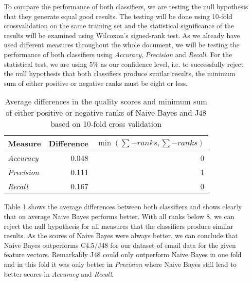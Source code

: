 To compare the performance of both classifiers, we are testing the null hypothesis that they generate equal good results.
The testing will be done using 10-fold crossvalidation on the same training set and the statistical significance of the results will be examined using Wilcoxon's signed-rank test.
As we already have used different measures throughout the whole document, we will be testing the performance of both classifiers using \emph{Accuracy}, \emph{Precision} and \emph{Recall}.
For the statistical test, we are using 5\% as our confidence level, i.e. to successfully reject the null hypothesis that both classifiers produce similar results, the minimum sum of either positive or negative ranks must be eight or less.

\begin{table}[h!]
    \centering
    \begin{tabular}{ | l | r | r | }
        \hline
        \textbf{Measure} & \textbf{Difference} & $\min(\sum +ranks, \sum -ranks)$ \\
        \hline
        \emph{Accuracy} & 0.048 & 0 \\
        \hline
        \emph{Precision} & 0.111 & 1 \\
        \hline
        \emph{Recall} & 0.167 & 0 \\
        \hline
    \end{tabular}
    \caption{Average differences in the quality scores and minimum sum of either positive or negative ranks of Naive Bayes and J48 based on 10-fold cross validation}
    \label{table:difference}
\end{table}

Table \ref{table:difference} shows the average differences between both classifiers and shows clearly that on average Naive Bayes performs better.
With all ranks below $8$, we can reject the null hypothesis for all measures that the classifiers produce similar results.
As the scores of Naive Bayes were always better, we can conclude that Naive Bayes outperforms C4.5/J48 for our dataset of email data for the given feature vectors.
Remarkably J48 could only outperform Naive Bayes in one fold and in this fold it was only better in \emph{Precision} where Naive Bayes still lead to better scores in \emph{Accuracy} and \emph{Recall}.

